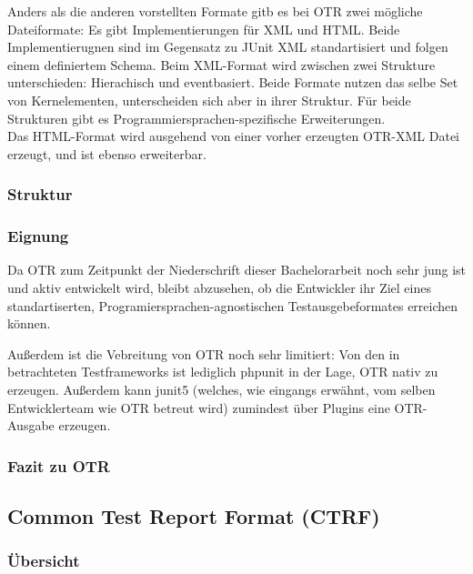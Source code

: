 Anders als die anderen vorstellten Formate gitb es bei OTR zwei mögliche Dateiformate: Es gibt Implementierungen für XML und HTML. Beide Implementierugnen sind im Gegensatz zu JUnit XML standartisiert und folgen einem definiertem Schema. Beim XML-Format wird zwischen zwei Strukture unterschieden: Hierachisch und eventbasiert. Beide Formate nutzen das selbe Set von Kernelementen, unterscheiden sich aber in ihrer Struktur. Für beide Strukturen gibt es Programmiersprachen-spezifische Erweiterungen.\\
Das HTML-Format wird ausgehend von einer vorher erzeugten OTR-XML Datei erzeugt, und ist ebenso erweiterbar. 

\subsubsection{Struktur}


\subsubsection{Eignung}
Da OTR zum Zeitpunkt der Niederschrift dieser Bachelorarbeit noch sehr jung ist und aktiv entwickelt wird, bleibt abzusehen, ob die Entwickler ihr Ziel eines standartiserten, Programiersprachen-agnostischen Testausgebeformates erreichen können.

Außerdem ist die Vebreitung von OTR noch sehr limitiert: Von den in  betrachteten Testframeworks ist lediglich phpunit in der Lage, OTR nativ zu erzeugen. Außerdem kann junit5 (welches, wie eingangs erwähnt, vom selben Entwicklerteam wie OTR betreut wird) zumindest über Plugins eine OTR-Ausgabe erzeugen.

\subsubsection{Fazit zu OTR}



\subsection{Common Test Report Format (CTRF)}
\subsubsection{Übersicht}

